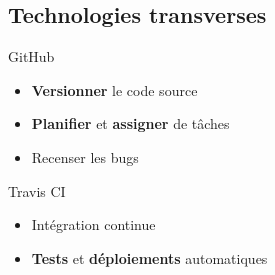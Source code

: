 \documentclass{beamer} %
\begin{document}
  \subsection{Technologies transverses}
  \begin{frame}{\subsecname}
    \begin{block}{GitHub}
      \begin{itemize}
        \item \textbf{Versionner} le code source
        \item \textbf{Planifier} et \textbf{assigner} de tâches
        \item Recenser les bugs
      \end{itemize}
    \end{block}

    \begin{block}{Travis CI}
      \begin{itemize}
        \item Intégration continue
        \item \textbf{Tests} et \textbf{déploiements} automatiques
      \end{itemize}
    \end{block}
    
  \end{frame}
\end{document}
